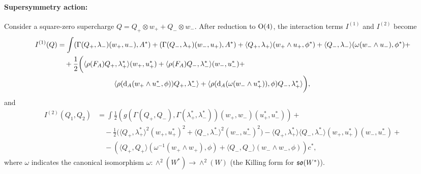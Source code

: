 \documentclass[10pt, oneside]{article}
\begin{document}
\vspace{-10pt}
\paragraph{Supersymmetry action:} 
\begin{prop}
Consider a square-zero supercharge $Q = Q_+ \otimes w_+ + Q_- \otimes w_-$.  After reduction to $\mathrm{O}(4)$, the interaction terms $I^{(1)}$ and $I^{(2)}$ become
\begin{align*}
I^{(1)}(Q) &= \int (\Gamma(Q_+, \lambda_-)(w_+,u_-), A^*) + (\Gamma(Q_-, \lambda_+)(w_-,u_+), A^*) + \langle Q_+, \lambda_+ \rangle (w_+ \wedge u_+, \phi^*) + \langle Q_-, \lambda_- \rangle (\omega(w_- \wedge u_-), \phi^*) + \\
&\quad + \frac12 \bigg( \langle \rho(F_A)Q_+, \lambda_+^*\rangle(w_+,u_+^*) + \langle \rho(F_A)Q_-, \lambda_-^*\rangle(w_-,u_-^*) +\\
&\qquad \qquad \qquad \qquad \langle\rho({\rm d}_A (w_+ \wedge u_-^*,\phi))Q_+, \lambda_-^*\rangle + \langle\rho({\rm d}_A (\omega(w_- \wedge u_+^*)),\phi)Q_-, \lambda_+^*\rangle \bigg),
\end{align*}
and
\begin{align*}
I^{(2)}(Q_1, Q_2) &= \int \frac 12 \left( g(\Gamma(Q_+, Q_-), \Gamma(\lambda^*_+, \lambda^*_-)) (w_+, w_-) (u_+^*,u_-^*) \right) + \\
&\quad - \frac 12 \big( \langle Q_+,\lambda_+^*\rangle^2(w_+,u_+^*)^2 + \langle Q_-,\lambda_-^*\rangle^2(w_-,u_-^*)^2 \big) - \langle Q_+,\lambda_+^*\rangle \langle Q_-, \lambda_-^*\rangle (w_+,u_+^*)(w_-,u_-^*) +\\
&\quad - (\langle Q_+, Q_+ \rangle (\omega^{-1}(w_+ \wedge w_+),\phi) + \langle Q_-, Q_- \rangle (w_- \wedge w_-,\phi)  ) c^*,
\end{align*}
where $\omega$ indicates the canonical isomorphism $\omega \colon \wedge^2(W^*) \to \wedge^2(W)$ (the Killing form for $\mathfrak{so}(W^*)$).
\end{prop}
%
\end{document}
